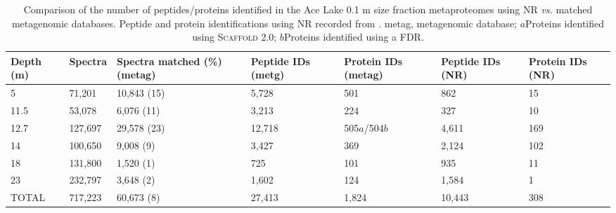 \begin{table}
\footnotesize
\caption[Comparison of peptides/proteins identified with \acs{NR} \emph{vs.} matched metagenomes]{Comparison of the number of peptides/proteins identified in the Ace Lake 0.1 \textmu{}m size fraction metaproteomes using \acs{NR} \emph{vs.} matched metagenomic databases. 
Peptide and protein identifications using \acs{NR} recorded from \citet{Ng2010b}. 
metag, metagenomic database; $a$Proteins identified using \textsc{Scaffold} 2.0; $b$Proteins identified using a \acs{FDR}.}
\label{tab:protid_stats}
\smallskip
\begin{tabularx}{\textwidth}{XXXXXXX}
\toprule
\textbf{Depth (m)} & \textbf{Spectra} & \textbf{Spectra matched (\%) (metag)} &\textbf{Peptide IDs (metg)} & \textbf{Protein IDs (metag)} & \textbf{Peptide IDs (\acs{NR})} & \textbf{Protein IDs (\acs{NR})} \\
\midrule
5     & 71,201  & 10,843 (15) & 5,728  & 501     & 862    & 15 \\
11.5  & 53,078  & 6,076 (11)  & 3,213  & 224     & 327    & 10 \\
12.7  & 127,697 & 29,578 (23) & 12,718 & 505$a$/504$b$ & 4,611  & 169 \\
14    & 100,650 & 9,008 (9)   & 3,427  & 369     & 2,124  & 102 \\
18    & 131,800 & 1,520 (1)   & 725    & 101     & 935    & 11 \\
23    & 232,797 & 3,648 (2)   & 1,602  & 124     & 1,584  & 1 \\
TOTAL & 717,223 & 60,673 (8)  & 27,413 & 1,824   & 10,443 & 308 \\
\bottomrule
\end{tabularx}
\end{table}
